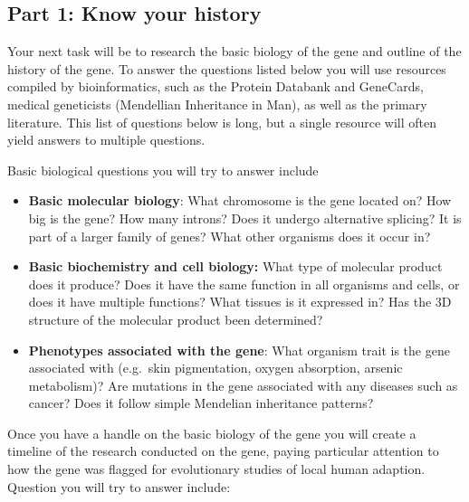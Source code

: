 \documentclass[
]{book}
\providecommand{\tightlist}{%
  \setlength{\itemsep}{0pt}\setlength{\parskip}{0pt}}
\begin{document}
\hypertarget{part-1-know-your-history}{%
\subsection{Part 1: Know your history}\label{part-1-know-your-history}}

Your next task will be to research the basic biology of the gene and outline of the history of the gene. To answer the questions listed below you will use resources compiled by bioinformatics, such as the Protein Databank and GeneCards, medical geneticists (Mendellian Inheritance in Man), as well as the primary literature. This list of questions below is long, but a single resource will often yield answers to multiple questions.

Basic biological questions you will try to answer include

\begin{itemize}
\tightlist
\item
  \textbf{Basic molecular biology}: What chromosome is the gene located on? How big is the gene? How many introns? Does it undergo alternative splicing? It is part of a larger family of genes? What other organisms does it occur in?\\
\item
  \textbf{Basic biochemistry and cell biology:} What type of molecular product does it produce? Does it have the same function in all organisms and cells, or does it have multiple functions? What tissues is it expressed in? Has the 3D structure of the molecular product been determined?
\item
  \textbf{Phenotypes associated with the gene}: What organism trait is the gene associated with (e.g.~skin pigmentation, oxygen absorption, arsenic metabolism)? Are mutations in the gene associated with any diseases such as cancer? Does it follow simple Mendelian inheritance patterns?
\end{itemize}

Once you have a handle on the basic biology of the gene you will create a timeline of the research conducted on the gene, paying particular attention to how the gene was flagged for evolutionary studies of local human adaption. Question you will try to answer include:
\end{document}
